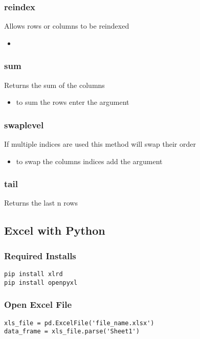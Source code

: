 %
\subsubsection{reindex}
Allows rows or columns to be reindexed
  \begin{itemize}

    \item \color{red}{if no arguments are passed the rows will be reindexed,
      and if the columns argument is passed the columns will be reindexed.}
  \end{itemize}

%
\subsubsection{sum}
Returns the sum of the columns
  \begin{itemize}

    \item to sum the rows enter the argument \color{red}{axis=1}
  \end{itemize}

%
\subsubsection{swaplevel}
If multiple indices are used this method will swap their order
  \begin{itemize}

    \item to swap the columns indices add the argument {\color{red}{axis=1}}
  \end{itemize}

%
\subsubsection{tail}
Returns the last n rows

\subsection{Excel with Python}

%
\subsubsection{Required Installs}
\begin{lstlisting}
pip install xlrd
pip install openpyxl
\end{lstlisting}

%
\subsubsection{Open Excel File}
\begin{lstlisting}
xls_file = pd.ExcelFile('file_name.xlsx')
data_frame = xls_file.parse('Sheet1')
\end{lstlisting}


